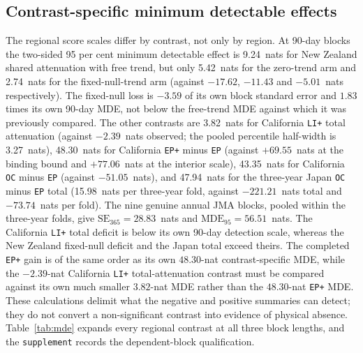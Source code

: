 \subsection{Contrast-specific minimum detectable effects}\label{sec:mde}
The regional score scales differ by contrast, not only by region. At 90-day blocks the two-sided 95 per cent minimum detectable effect is 9.24~nats for New Zealand shared attenuation with free trend, but only 5.42~nats for the zero-trend arm and 2.74~nats for the fixed-null-trend arm (against $-17.62$, $-11.43$ and $-5.01$~nats respectively). The fixed-null loss is $-3.59$ of its own block standard error and $1.83$ times its own 90-day MDE, not below the free-trend MDE against which it was previously compared. The other contrasts are 3.82~nats for California \texttt{LI+} total attenuation (against $-2.39$~nats observed; the pooled percentile half-width is 3.27~nats), 48.30~nats for California \texttt{EP+} minus \texttt{EP} (against $+69.55$~nats at the binding bound and $+77.06$~nats at the interior scale), 43.35~nats for California \texttt{OC} minus \texttt{EP} (against $-51.05$~nats), and 47.94~nats for the three-year Japan \texttt{OC} minus \texttt{EP} total (15.98~nats per three-year fold, against $-221.21$~nats total and $-73.74$~nats per fold). The nine genuine annual JMA blocks, pooled within the three-year folds, give $\mathrm{SE}_{365}=28.83$~nats and $\mathrm{MDE}_{95}=56.51$~nats. The California \texttt{LI+} total deficit is below its own 90-day detection scale, whereas the New Zealand fixed-null deficit and the Japan total exceed theirs. The completed \texttt{EP+} gain is of the same order as its own $48.30$-nat contrast-specific MDE, while the $-2.39$-nat California \texttt{LI+} total-attenuation contrast must be compared against its own much smaller $3.82$-nat MDE rather than the $48.30$-nat \texttt{EP+} MDE. These calculations delimit what the negative and positive summaries can detect; they do not convert a non-significant contrast into evidence of physical absence. Table~\ref{tab:mde} expands every regional contrast at all three block lengths, and the \texttt{supplement} records the dependent-block qualification.

